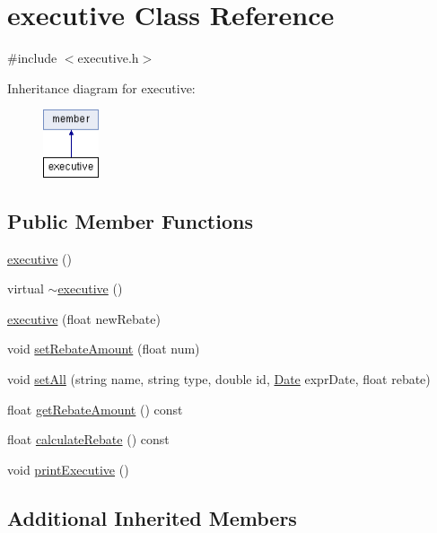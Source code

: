 \hypertarget{classexecutive}{}\section{executive Class Reference}
\label{classexecutive}


{\ttfamily \#include $<$executive.\+h$>$}

Inheritance diagram for executive\+:\begin{figure}[H]
\begin{center}
\leavevmode
\includegraphics[height=2.000000cm]{classexecutive}
\end{center}
\end{figure}
\subsection*{Public Member Functions}
\begin{DoxyCompactItemize}
\item 
\hyperlink{classexecutive_af89b69f24d47db479a8fc99c1905ddda}{executive} ()
\item 
virtual \hyperlink{classexecutive_a0d6dc7441c758d7c1fa3a375720e6952}{$\sim$executive} ()
\item 
\hyperlink{classexecutive_a563a87fd522a77800a9105f318250fc7}{executive} (float new\+Rebate)
\item 
void \hyperlink{classexecutive_a74668e419f25f3e4fdb010de2250b6ff}{set\+Rebate\+Amount} (float num)
\item 
void \hyperlink{classexecutive_a0ab0c926285aac0744ecd2c264ba69c8}{set\+All} (string name, string type, double id, \hyperlink{class_date}{Date} expr\+Date, float rebate)
\item 
float \hyperlink{classexecutive_aace302595496f393e25c49c085ef9bf1}{get\+Rebate\+Amount} () const 
\item 
float \hyperlink{classexecutive_a48b4388f63f755e4d523533f9e51c9fa}{calculate\+Rebate} () const 
\item 
void \hyperlink{classexecutive_a278ca61f0c26ecddc5bf2a7c85265c03}{print\+Executive} ()
\end{DoxyCompactItemize}
\subsection*{Additional Inherited Members}


